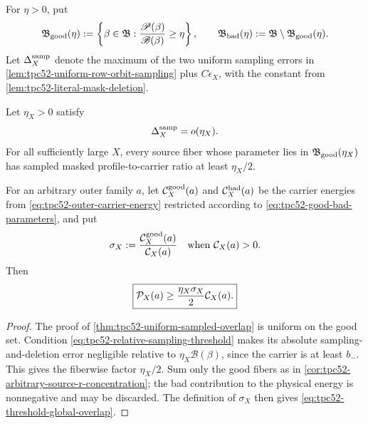 For \(\eta>0\), put
\begin{equation}
 \mathfrak B_{\rm good}(\eta)
 :=\left\{\beta\in\mathfrak B:
          \frac{\mathscr P(\beta)}{\mathscr B(\beta)}\ge\eta\right\},
 \qquad
 \mathfrak B_{\rm bad}(\eta):=\mathfrak B\setminus
          \mathfrak B_{\rm good}(\eta).
 \label{eq:tpc52-good-bad-parameters}
\end{equation}
Let \(\Delta_X^{\rm samp}\) denote the maximum of the two uniform sampling errors in
\cref{lem:tpc52-uniform-row-orbit-sampling} plus \(C\epsilon_X\), with the
constant from \cref{lem:tpc52-literal-mask-deletion}.

\begin{proposition}
\label{prop:tpc52-threshold-overlap}
Let \(\eta_X>0\) satisfy
\begin{equation}
 \Delta_X^{\rm samp}=o(\eta_X).
 \label{eq:tpc52-relative-sampling-threshold}
\end{equation}
For all sufficiently large \(X\), every source fiber whose parameter lies in
\(\mathfrak B_{\rm good}(\eta_X)\) has sampled masked profile-to-carrier
ratio at least \(\eta_X/2\).

For an arbitrary outer family \(a\), let \(\mathcal C_X^{\rm good}(a)\) and
\(\mathcal C_X^{\rm bad}(a)\) be the carrier energies from
\eqref{eq:tpc52-outer-carrier-energy} restricted according to
\eqref{eq:tpc52-good-bad-parameters}, and put
\begin{equation}
 \sigma_X:=\frac{\mathcal C_X^{\rm good}(a)}{\mathcal C_X(a)}
 \quad\text{when }\mathcal C_X(a)>0.
 \label{eq:tpc52-good-carrier-fraction}
\end{equation}
Then
\begin{equation}
 \boxed{
 \mathcal P_X(a)\ge \frac{\eta_X\sigma_X}{2}\mathcal C_X(a).}
 \label{eq:tpc52-threshold-global-overlap}
\end{equation}
\end{proposition}

\begin{proof}
The proof of \cref{thm:tpc52-uniform-sampled-overlap} is uniform on the good
set.  Condition \eqref{eq:tpc52-relative-sampling-threshold} makes its
absolute sampling-and-deletion error negligible relative to
\(\eta_X\mathscr B(\beta)\), since the carrier is at least \(b_-\).
This gives the fiberwise factor \(\eta_X/2\).  Sum only the good fibers as in
\cref{cor:tpc52-arbitrary-source-r-concentration}; the bad contribution to
the physical energy is nonnegative and may be discarded.  The definition of
\(\sigma_X\) then gives \eqref{eq:tpc52-threshold-global-overlap}.
\end{proof}

